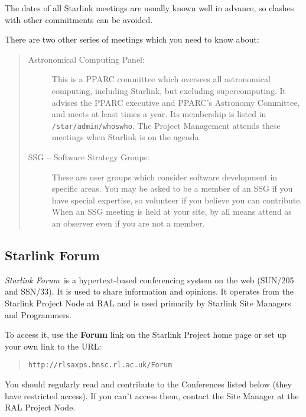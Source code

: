 \documentclass[twoside,11pt]{article}
\newcommand{\htmladdnormallink}[2]{#1}
\newcommand{\xref}[3]{#1}
\begin{document}
The dates of all Starlink meetings are usually known well in advance, so clashes
with other commitments can be avoided.
 
There are two other series of meetings which you need to know about:

\begin{quote}
\begin{description}

\item [Astronomical Computing Panel:]
This is a PPARC committee which oversees all astronomical computing,
including Starlink, but excluding supercomputing.
It advises the PPARC executive and PPARC's Astronomy Committee, and meets at
least times a year.
Its membership is listed in {\tt /star/admin/whoswho}.
The Project Management attends these meetings when Starlink is on the agenda.

\item [SSG -- Software Strategy Groups:]
These are user groups which consider software development in specific areas.
You may be asked to be a member of an SSG if you have special expertise,
so volunteer if you believe you can contribute.
When an SSG meeting is held at your site, by all means attend as an observer
even if you are not a member.

\end{description}
\end{quote}

\subsection {Starlink Forum}

{\em Starlink Forum}\, is a hypertext-based conferencing system on the web
(\xref{SUN/205}{sun205}{} and 
\xref{SSN/33}{ssn33}{}).
It is used to share information and opinions.
It operates from the Starlink Project Node at RAL and is used primarily by
Starlink Site Managers and Programmers.

To access it, use the
\htmladdnormallink{{\bf Forum}}{http://rlsaxps.bnsc.rl.ac.uk/Forum}
link on the Starlink Project home page or set
up your own link to the URL:
\begin{quote}
{\tt http://rlsaxps.bnsc.rl.ac.uk/Forum}
\end{quote}
You should regularly read and contribute to the Conferences listed below
(they have restricted access).
If you can't access them, contact the Site Manager at the RAL Project Node.
\end{document}
